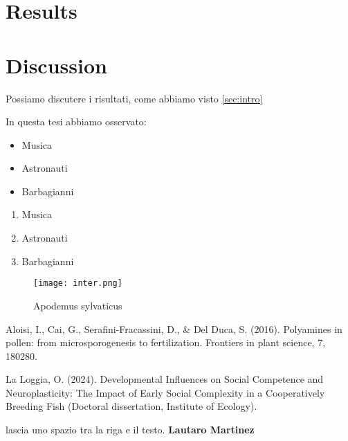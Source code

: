 \documentclass[12pt]{article}
\begin{document}
\section{Results}

\section{Discussion}
Possiamo discutere i risultati, come abbiamo visto \ref{sec:intro} %


In questa tesi abbiamo osservato:
\begin{itemize}
    \item Musica
    \item Astronauti
    \item Barbagianni
\end{itemize} %

\begin{enumerate} 
    \item Musica
    \item Astronauti
    \item Barbagianni
\end{enumerate}

\newpage %

\begin{figure}
    \centering %
    \texttt{[image: inter.png]} %
    \caption{Apodemus sylvaticus} %
    \label{fig:chagall} %
\end{figure}

\newpage
\begin{thebibliography}{999} %
    
    Aloisi, I., Cai, G., Serafini-Fracassini, D., \& Del Duca, S. (2016). Polyamines in pollen: from microsporogenesis to fertilization. Frontiers in plant science, 7, 180280. %
    
    La Loggia, O. (2024). Developmental Influences on Social Competence and Neuroplasticity: The Impact of Early Social Complexity in a Cooperatively Breeding Fish (Doctoral dissertation, Institute of Ecology).

\end{thebibliography}

\newpage

\hline %
\bigskip
lascia uno spazio tra la riga e il testo.
\textbf{Lautaro Martinez}
\bigskip
\hline %
\end{document}
